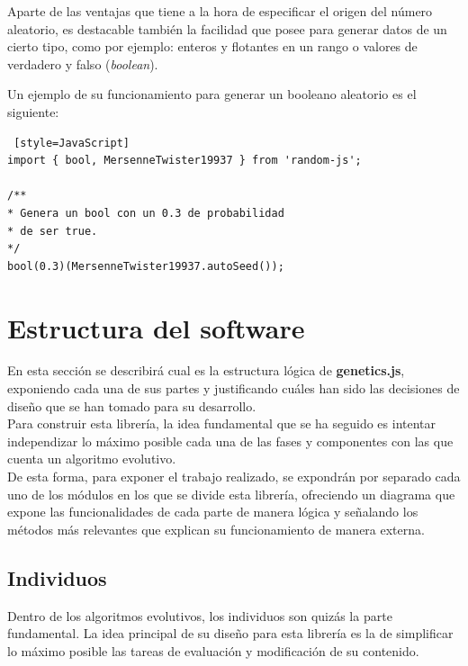 Aparte de las ventajas que tiene a la hora de especificar el origen del número aleatorio, es destacable también la facilidad que posee para generar datos de un cierto tipo, como por ejemplo: enteros y flotantes en un rango o valores de verdadero y falso (\textit{boolean}). \\

\clearpage

Un ejemplo de su funcionamiento para generar un booleano aleatorio es el siguiente: \\

\begin{lstlisting} [style=JavaScript]
import { bool, MersenneTwister19937 } from 'random-js';

/**
* Genera un bool con un 0.3 de probabilidad
* de ser true.
*/
bool(0.3)(MersenneTwister19937.autoSeed());
\end{lstlisting}

\section{Estructura del software}
\label{4:sec:2}

En esta sección se describirá cual es la estructura lógica de \textbf{genetics.js}, exponiendo cada una de sus partes y justificando cuáles han sido las decisiones de diseño que se han tomado para su desarrollo. \\

Para construir esta librería, la idea fundamental que se ha seguido es intentar independizar lo máximo posible cada una de las fases y componentes con las que cuenta un algoritmo evolutivo. \\

De esta forma, para exponer el trabajo realizado, se expondrán por separado cada uno de los módulos en los que se divide esta librería, ofreciendo un diagrama que expone las funcionalidades de cada parte de manera lógica y señalando los métodos más relevantes que explican su funcionamiento de manera externa.

\subsection{Individuos}

Dentro de los algoritmos evolutivos, los individuos son quizás la parte fundamental. La idea principal de su diseño para esta librería es la de simplificar lo máximo posible las tareas de evaluación y modificación de su contenido. \\

